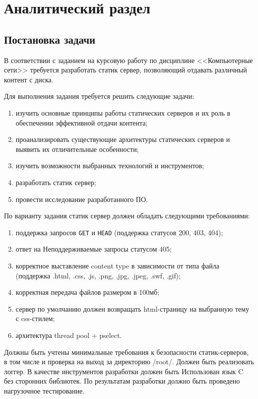\section{Аналитический раздел}
\subsection{Постановка задачи}
В соответствии с заданием на курсовую работу по дисциплине <<Компьютерные сети>> требуется разработать статик сервер, позволяющий отдавать различный контент с диска.

Для выполнения задания требуется решить следующие задачи:
\begin{enumerate}
	\item изучить основные принципы работы статических серверов и их роль в обеспечении эффективной отдачи контента;
	\item проанализировать существующие архитектуры статических серверов и выявить их отличительные особенности;
	\item изучить возможности выбранных технологий и инструментов;
	\item разработать статик сервер;
	\item провести исследование разработанного ПО.
\end{enumerate}

По варианту задания статик сервер должен обладать следующими требованиями:
\begin{enumerate}
	\item поддержка запросов \texttt{GET} и \texttt{HEAD} (поддержка статусов 200, 403, 404);
	\item ответ на Неподдерживаемые запросы статусом 405;
	\item корректное выставление content type в зависимости от типа файла (поддержка .html, .css, .js, .png, .jpg, .jpeg, .swf, .gif);
	\item корректная передача файлов размером в 100мб;
	\item сервер по умолчанию должен возвращать html-страницу на выбранную тему с css-стилем;
	\item архитектура thread pool + pselect.
\end{enumerate}

Должны быть учтены минимальные требования к безопасности статик-серверов, в том числе и проверка на выход за директорию /root/. Должен быть реализовать логгер. В качестве инструментов разработки должен быть Использован язык C без сторонних библиотек. По результатам разработки должно быть проведено нагрузочное тестирование.

